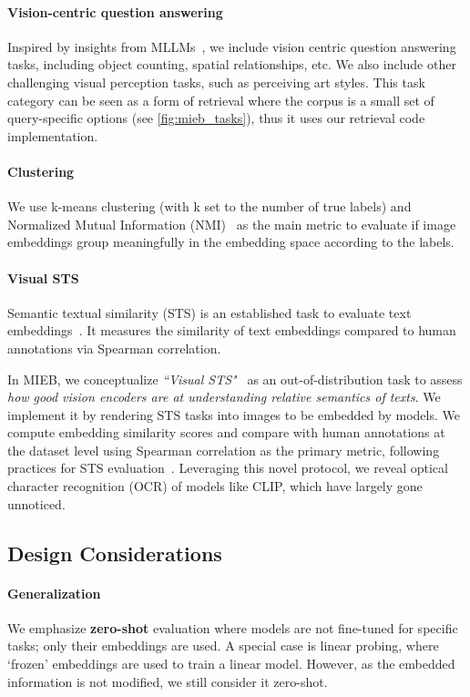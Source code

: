 \paragraph{Vision-centric question answering} Inspired by insights from MLLMs~\citep{tong2024cambrian}, we include vision centric question answering tasks, including object counting, spatial relationships, etc. We also include other challenging visual perception tasks, such as perceiving art styles. This task category can be seen as a form of retrieval where the corpus is a small set of query-specific options (see \autoref{fig:mieb_tasks}), thus it uses our retrieval code implementation.

\paragraph{Clustering} We use k-means clustering (with k set to the number of true labels) and Normalized Mutual Information (NMI)~\citep{collignon1995automated,studholme1999overlap} as the main metric to evaluate if image embeddings group meaningfully in the embedding space according to the labels.

\paragraph{Visual STS} Semantic textual similarity (STS) is an established task to evaluate text embeddings~\cite{agirre-etal-2013-sem,cer-etal-2017-semeval}. It measures the similarity of text embeddings compared to human annotations via Spearman correlation.

In MIEB, we conceptualize \textit{``Visual STS"}~\citep{xiao2024pixel} as an out-of-distribution task to assess \textit{how good vision encoders are at understanding relative semantics of texts}. We implement it by rendering STS tasks into images to be embedded by models. We compute embedding similarity scores and compare with human annotations at the dataset level using Spearman correlation as the primary metric, following practices for STS evaluation~\citep{muennighoff2023mteb}. Leveraging this novel protocol, we reveal optical character recognition (OCR) of models like CLIP, which have largely gone unnoticed.

\subsection{Design Considerations}

\paragraph{Generalization} We emphasize \textbf{zero-shot} evaluation where models are not fine-tuned for specific tasks; only their embeddings are used. A special case is linear probing, where `frozen' embeddings are used to train a linear model. However, as the embedded information is not modified, we still consider it zero-shot.

